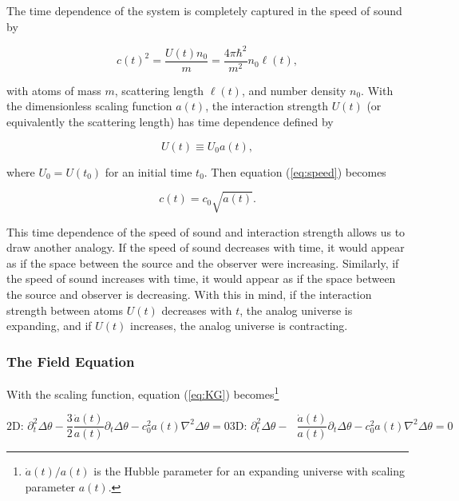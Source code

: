 \documentclass{article}
\begin{document}
            The time dependence of the system is completely captured in the speed of sound by 

            \begin{equation} \label{eq:speed}
                c(t)^2 = \frac{U(t) n_0}{m} = \frac{4 \pi \hbar^2}{m^2} n_0 \ell(t),
            \end{equation}

            with atoms of mass $m$, scattering length $\ell(t)$, and number density $n_0$.  With the dimensionless scaling function $a(t)$, the interaction strength $U(t)$ (or equivalently the scattering length) has time dependence defined by 

            \begin{equation}
                U(t) \equiv U_0 a(t),
            \end{equation}

            where $U_0 = U(t_0)$ for an initial time $t_0$.  Then equation (\ref{eq:speed}) becomes 

            \begin{equation}
                c(t) = c_0 \sqrt{a(t)}.
            \end{equation}

            This time dependence of the speed of sound and interaction strength allows us to draw another analogy.  If the speed of sound decreases with time, it would appear as if the space between the source and the observer were increasing.  Similarly, if the speed of sound increases with time, it would appear as if the space between the source and observer is decreasing. With this in mind, if the interaction strength between atoms $U(t)$ decreases with $t$, the analog universe is expanding, and if $U(t)$ increases, the analog universe is contracting.

        \subsubsection{The Field Equation}

            With the scaling function, equation (\ref{eq:KG}) becomes\footnote{$\dot{a}(t) / a(t)$ is the Hubble parameter for an expanding universe with scaling parameter $a(t)$.}

            \begin{subequations}
            \begin{equation} \label{eq:fieldEquation2D}
                \text{2D: } \partial_t^2\Delta\theta - \frac{3}{2} \frac{\dot{a}(t)}{a(t)} \partial_t \Delta\theta - c_0^2 a(t) \nabla^2\Delta\theta = 0
            \end{equation}
            \begin{equation} \label{eq:fieldEquation3D}
                \text{3D: } \partial_t^2\Delta\theta - \phantom{\frac{3}{2}} \frac{\dot{a}(t)}{a(t)} \partial_t \Delta\theta - c_0^2 a(t) \nabla^2\Delta\theta = 0
            \end{equation}
            \end{subequations}
\end{document}
